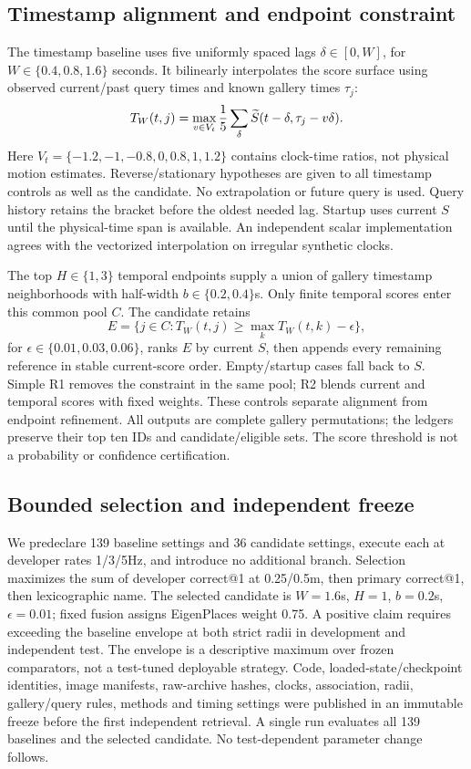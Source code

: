 \documentclass[conference,letterpaper]{IEEEtran}
\begin{document}
\subsection{Timestamp alignment and endpoint constraint}
The timestamp baseline uses five uniformly spaced lags $\delta\in[0,W]$, for $W\in\{0.4,0.8,1.6\}$ seconds. It bilinearly interpolates the score surface using observed current/past query times and known gallery times $\tau_j$:
\begin{equation}
T_W(t,j)=\max_{v\in V_t}{1\over5}\sum_{\delta}\widetilde S(t-\delta,\tau_j-v\delta).
\end{equation}
Here $V_t=\{-1.2,-1,-0.8,0,0.8,1,1.2\}$ contains clock-time ratios, not physical motion estimates. Reverse/stationary hypotheses are given to all timestamp controls as well as the candidate. No extrapolation or future query is used. Query history retains the bracket before the oldest needed lag. Startup uses current $S$ until the physical-time span is available. An independent scalar implementation agrees with the vectorized interpolation on irregular synthetic clocks.

The top $H\in\{1,3\}$ temporal endpoints supply a union of gallery timestamp neighborhoods with half-width $b\in\{0.2,0.4\}$s. Only finite temporal scores enter this common pool $C$. The candidate retains
\begin{equation}
E=\{j\in C:T_W(t,j)\ge\max_kT_W(t,k)-\epsilon\},
\end{equation}
for $\epsilon\in\{0.01,0.03,0.06\}$, ranks $E$ by current $S$, then appends every remaining reference in stable current-score order. Empty/startup cases fall back to $S$. Simple R1 removes the constraint in the same pool; R2 blends current and temporal scores with fixed weights. These controls separate alignment from endpoint refinement. All outputs are complete gallery permutations; the ledgers preserve their top ten IDs and candidate/eligible sets. The score threshold is not a probability or confidence certification.

\subsection{Bounded selection and independent freeze}
We predeclare 139 baseline settings and 36 candidate settings, execute each at developer rates 1/3/5Hz, and introduce no additional branch. Selection maximizes the sum of developer correct@1 at 0.25/0.5m, then primary correct@1, then lexicographic name. The selected candidate is $W=1.6$s, $H=1$, $b=0.2$s, $\epsilon=0.01$; fixed fusion assigns EigenPlaces weight 0.75. A positive claim requires exceeding the baseline envelope at both strict radii in development and independent test. The envelope is a descriptive maximum over frozen comparators, not a test-tuned deployable strategy. Code, loaded-state/checkpoint identities, image manifests, raw-archive hashes, clocks, association, radii, gallery/query rules, methods and timing settings were published in an immutable freeze before the first independent retrieval. A single run evaluates all 139 baselines and the selected candidate. No test-dependent parameter change follows.
\end{document}
